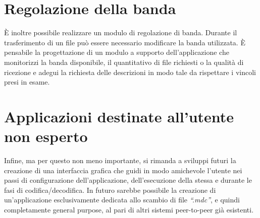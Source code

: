 \section{Regolazione della banda}
\`E inoltre possibile realizzare un modulo di regolazione di banda. Durante il
trasferimento di un file può essere necessario modificare la banda utilizzata. \`E pensabile la progettazione di un modulo a supporto
dell'applicazione che monitorizzi la banda disponibile, il quantitativo di file
richiesti o la qualità di ricezione e adegui la richiesta delle descrizioni in
modo tale da rispettare i vincoli presi in esame.

\section{Applicazioni destinate all'utente non esperto}
Infine, ma per questo non meno importante, si rimanda a sviluppi futuri la
creazione di una interfaccia grafica che guidi in modo amichevole l'utente nei
passi di configurazione dell'applicazione, dell'esecuzione della stessa e
durante le fasi di codifica/decodifica. In futuro sarebbe possibile la
creazione di un'applicazione esclusivamente dedicata allo scambio di file
\emph{``.mdc''}, e quindi completamente general purpose, al pari di altri
sistemi peer-to-peer già esistenti.
